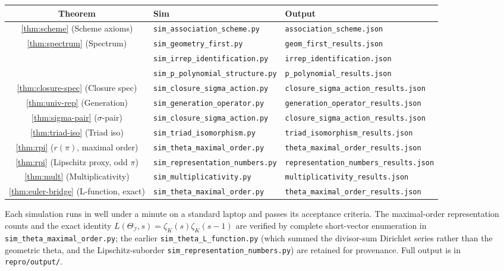 \documentclass[11pt,a4paper]{article}
\theoremstyle{definition}
\theoremstyle{remark}
\newcommand{\II}{\mathcal{I}}
\begin{document}
\begin{center}
\begin{tabular}{|c|l|l|}
\hline
\textbf{Theorem} & \textbf{Sim} & \textbf{Output} \\
\hline
\ref{thm:scheme} (Scheme axioms)        & \texttt{sim\_association\_scheme.py}    & \texttt{association\_scheme.json} \\
\ref{thm:spectrum} (Spectrum)            & \texttt{sim\_geometry\_first.py}        & \texttt{geom\_first\_results.json} \\
                                          & \texttt{sim\_irrep\_identification.py}  & \texttt{irrep\_identification.json} \\
                                          & \texttt{sim\_p\_polynomial\_structure.py} & \texttt{p\_polynomial\_results.json} \\
\ref{thm:closure-spec} (Closure spec)    & \texttt{sim\_closure\_sigma\_action.py} & \texttt{closure\_sigma\_action\_results.json} \\
\ref{thm:univ-rep} (Generation)          & \texttt{sim\_generation\_operator.py}   & \texttt{generation\_operator\_results.json} \\
\ref{thm:sigma-pair} ($\sigma$-pair)     & \texttt{sim\_closure\_sigma\_action.py} & \texttt{closure\_sigma\_action\_results.json} \\
\ref{thm:triad-iso} (Triad iso)          & \texttt{sim\_triad\_isomorphism.py}     & \texttt{triad\_isomorphism\_results.json} \\
\ref{thm:rpi} ($r(\pi)$, maximal order)   & \texttt{sim\_theta\_maximal\_order.py}  & \texttt{theta\_maximal\_order\_results.json} \\
\ref{thm:rpi} (Lipschitz proxy, odd $\pi$) & \texttt{sim\_representation\_numbers.py} & \texttt{representation\_numbers\_results.json} \\
\ref{thm:mult} (Multiplicativity)        & \texttt{sim\_multiplicativity.py}       & \texttt{multiplicativity\_results.json} \\
\ref{thm:euler-bridge} (L-function, exact) & \texttt{sim\_theta\_maximal\_order.py}  & \texttt{theta\_maximal\_order\_results.json} \\
\hline
\end{tabular}
\end{center}

Each simulation runs in well under a minute on a standard laptop and passes its
acceptance criteria. The maximal-order representation counts and the exact
identity $L(\Theta_\II,s)=\zeta_K(s)\zeta_K(s-1)$ are verified by complete
short-vector enumeration in \texttt{sim\_theta\_maximal\_order.py}; the earlier
\texttt{sim\_theta\_L\_function.py} (which summed the divisor-sum Dirichlet
series rather than the geometric theta, and the Lipschitz-suborder
\texttt{sim\_representation\_numbers.py}) are retained for provenance. Full
output is in \texttt{repro/output/}.
\end{document}
